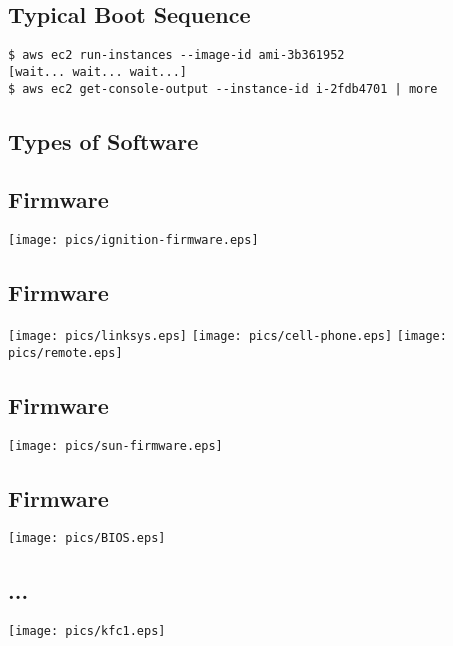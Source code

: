 \documentclass[xga]{xdvislides}
\begin{document}
\subsection{Typical Boot Sequence}
\vspace*{\fill}
\begin{verbatim}
$ aws ec2 run-instances --image-id ami-3b361952
[wait... wait... wait...]
$ aws ec2 get-console-output --instance-id i-2fdb4701 | more
\end{verbatim}
\vspace*{\fill}


\subsection{Types of Software}

\subsection{Firmware}
\begin{center}
	\texttt{[image: pics/ignition-firmware.eps]}
\end{center}

\subsection{Firmware}
\begin{center}
	\texttt{[image: pics/linksys.eps]}
	\texttt{[image: pics/cell-phone.eps]}
	\texttt{[image: pics/remote.eps]}
\end{center}

\subsection{Firmware}
\begin{center}
	\texttt{[image: pics/sun-firmware.eps]}
\end{center}

\subsection{Firmware}
\begin{center}
	\texttt{[image: pics/BIOS.eps]}
\end{center}

\subsection{...}
\begin{center}
	\texttt{[image: pics/kfc1.eps]}
\end{center}
\end{document}
